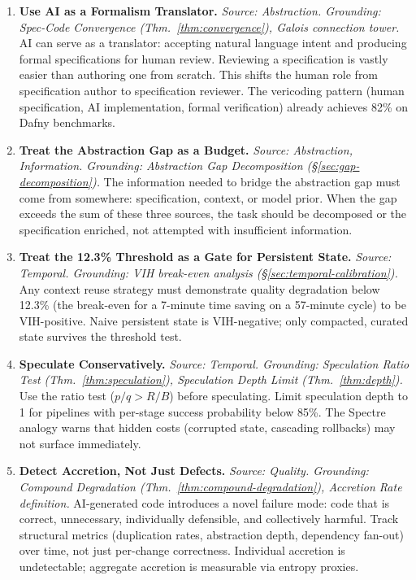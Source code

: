 \documentclass[11pt, a4paper, logo, copyright]{googledeepmind}
\begin{document}
\begin{enumerate}[label=\textbf{P\arabic*.}, leftmargin=3em, resume]

\item \textbf{Use AI as a Formalism Translator.}
\emph{Source: Abstraction. Grounding: Spec-Code Convergence (Thm.~\ref{thm:convergence}), Galois connection tower.}
AI can serve as a translator: accepting natural language intent and producing formal specifications for human review. Reviewing a specification is vastly easier than authoring one from scratch. This shifts the human role from specification author to specification reviewer. The vericoding pattern (human specification, AI implementation, formal verification) already achieves 82\% on Dafny benchmarks.

\item \textbf{Treat the Abstraction Gap as a Budget.}
\emph{Source: Abstraction, Information. Grounding: Abstraction Gap Decomposition (\S\ref{sec:gap-decomposition}).}
The information needed to bridge the abstraction gap must come from somewhere: specification, context, or model prior. When the gap exceeds the sum of these three sources, the task should be decomposed or the specification enriched, not attempted with insufficient information.

\item \textbf{Treat the 12.3\% Threshold as a Gate for Persistent State.}
\emph{Source: Temporal. Grounding: VIH break-even analysis (\S\ref{sec:temporal-calibration}).}
Any context reuse strategy must demonstrate quality degradation below 12.3\% (the break-even for a 7-minute time saving on a 57-minute cycle) to be VIH-positive. Naive persistent state is VIH-negative; only compacted, curated state survives the threshold test.

\item \textbf{Speculate Conservatively.}
\emph{Source: Temporal. Grounding: Speculation Ratio Test (Thm.~\ref{thm:speculation}), Speculation Depth Limit (Thm.~\ref{thm:depth}).}
Use the ratio test ($p/q > R/B$) before speculating. Limit speculation depth to 1 for pipelines with per-stage success probability below 85\%. The Spectre analogy warns that hidden costs (corrupted state, cascading rollbacks) may not surface immediately.

\item \textbf{Detect Accretion, Not Just Defects.}
\emph{Source: Quality. Grounding: Compound Degradation (Thm.~\ref{thm:compound-degradation}), Accretion Rate definition.}
AI-generated code introduces a novel failure mode: code that is correct, unnecessary, individually defensible, and collectively harmful. Track structural metrics (duplication rates, abstraction depth, dependency fan-out) over time, not just per-change correctness. Individual accretion is undetectable; aggregate accretion is measurable via entropy proxies.


\end{enumerate}
\end{document}
